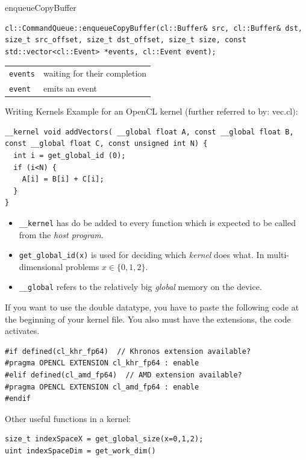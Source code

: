 \documentclass[footexclude,twocolumn,DIV25,fontsize=10pt]{scrreprt}
\makeatletter
\renewcommand{\section}{\@startsection{section}{1}{0mm}
	{-1.7ex}{0.7ex}{\normalfont\large\bfseries}}
\renewcommand{\subsection}{\@startsection{subsection}{2}{0mm}
	{-1.7ex}{0.5ex}{\normalfont\normalsize\bfseries}}
\makeatother
\begin{document}
\subsection{enqueueCopyBuffer}
\begin{lstlisting}[breaklines=true,frame=tb]
cl::CommandQueue::enqueueCopyBuffer(cl::Buffer& src, cl::Buffer& dst, size_t src_offset, size_t dst_offset, size_t size, const std::vector<cl::Event> *events, cl::Event event);
\end{lstlisting}
\begin{tabularx}{\hsize}{lX}
  \verb*+events+ & waiting for their completion \\
  \verb*+event+ & emits an event \\
\end{tabularx}

\section{Writing Kernels}
Example for an OpenCL kernel (further referred to by: vec.cl):
\begin{lstlisting}[breaklines=true,frame=tb]
__kernel void addVectors( __global float A, const __global float B, const __global float C, const unsigned int N) {
  int i = get_global_id (0);
  if (i<N) {
    A[i] = B[i] + C[i];
  }
}
\end{lstlisting}
\begin{itemize}
\item \verb*+__kernel+ has do be added to every function which is expected to be called from the \textit{host program}.
\item \verb*+get_global_id(x)+ is used for deciding which \textit{kernel} does what. In multi-dimensional problems $x \in \{0, 1, 2\}$.
\item \verb*+__global+ refers to the relatively big \textit{global} memory on the device.
\end{itemize}
If you want to use the double datatype, you have to paste the following code at the beginning of your kernel file. You also must have the extensions, the code activates.
\begin{lstlisting}[breaklines=true,frame=tb]
#if defined(cl_khr_fp64)  // Khronos extension available?
#pragma OPENCL EXTENSION cl_khr_fp64 : enable
#elif defined(cl_amd_fp64)  // AMD extension available?
#pragma OPENCL EXTENSION cl_amd_fp64 : enable
#endif
\end{lstlisting}
Other useful functions in a kernel:
\begin{lstlisting}[breaklines=true,frame=tb]
size_t indexSpaceX = get_global_size(x=0,1,2);
uint indexSpaceDim = get_work_dim()
\end{lstlisting}
\end{document}
